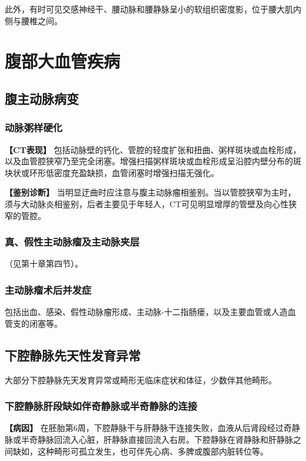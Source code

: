 此外，有时可见交感神经干、腰动脉和腰静脉呈小的软组织密度影，位于腰大肌内侧与腰椎之间。

\section{腹部大血管疾病}

\subsection{腹主动脉病变}

\subsubsection{动脉粥样硬化}

\textbf{【CT表现】}
包括动脉壁的钙化、管腔的轻度扩张和扭曲、粥样斑块或血栓形成，以及血管腔狭窄乃至完全闭塞。增强扫描粥样斑块或血栓形成呈沿腔内壁分布的斑块状或环形低密度充盈缺损，血管闭塞时增强扫描无强化。

\textbf{【鉴别诊断】}
当明显迂曲时应注意与腹主动脉瘤相鉴别。当以管腔狭窄为主时，须与大动脉炎相鉴别，后者主要见于年轻人，CT可见明显增厚的管壁及向心性狭窄的管腔。

\subsubsection{真、假性主动脉瘤及主动脉夹层}

（见第十章第四节）。

\subsubsection{主动脉瘤术后并发症}

包括出血、感染、假性动脉瘤形成、主动脉-十二指肠瘘，以及主要血管或人造血管支的闭塞等。

\subsection{下腔静脉先天性发育异常}

大部分下腔静脉先天发育异常或畸形无临床症状和体征，少数伴其他畸形。

\subsubsection{下腔静脉肝段缺如伴奇静脉或半奇静脉的连接}

\textbf{【病因】}
在胚胎第6周，下腔静脉干与肝静脉干连接失败，血液从后肾段经过奇静脉或半奇静脉回流入心脏，肝静脉直接回流入右房。下腔静脉在肾静脉和肝静脉之间缺如，这种畸形可孤立发生，也可伴先心病、多脾或腹部内脏转位等。

